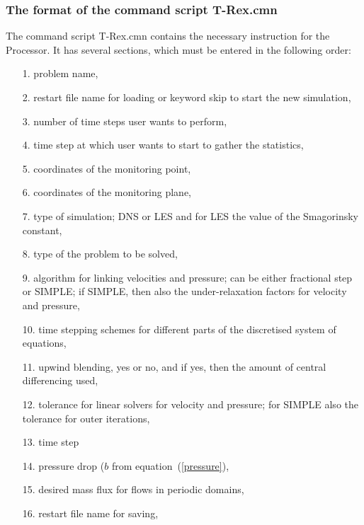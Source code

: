 \documentclass[10pt]{article}
\newcommand*{\tc}{\ttfamily} %
\newcommand*{\tn}{\sffamily} %
\begin{document}
    \subsubsection{The format of the command script {\tc T-Rex.cmn}} 

    The command script {\tc T-Rex.cmn} contains the necessary 
    instruction for the {\tn Processor}. It has several sections,
    which must be entered in the following order:
    \begin{itemize}
    \item[1.]  problem name,
    \item[2.]  restart file name for loading or keyword skip
               to start the new simulation, 
    \item[3.]  number of time steps user wants to perform,
    \item[4.]  time step at which user wants to start to gather
               the statistics,
    \item[5.]  coordinates of the monitoring point,
    \item[6.]  coordinates of the monitoring plane,
    \item[7.]  type of simulation; DNS or LES and for LES the
               value of the Smagorinsky constant,
    \item[8.]  type of the problem to be solved,
    \item[9.]  algorithm for linking velocities and pressure;
               can be either fractional step or SIMPLE; if
               SIMPLE, then also the under-relaxation factors
               for velocity and pressure,
    \item[10.] time stepping schemes for different parts of the
               discretised system of equations,
    \item[11.] upwind blending, yes or no, and if yes, then the
               amount of central differencing used,
    \item[12.] tolerance for linear solvers for velocity and
               pressure; for SIMPLE also the tolerance for
               outer iterations,
    \item[13.] time step
    \item[14.] pressure drop ($b$ from equation~(\ref{pressure}),
    \item[15.] desired mass flux for flows in periodic domains,
    \item[16.] restart file name for saving,

\end{itemize}
\end{document}
